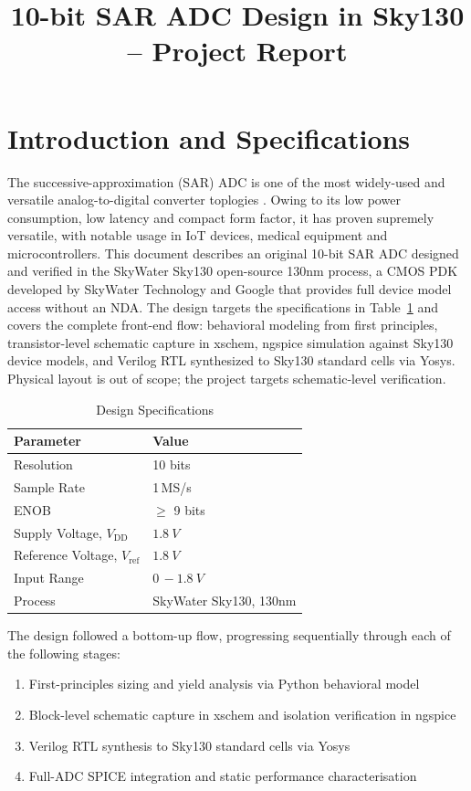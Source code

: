 \documentclass[12pt, a4paper]{article}
\title{10-bit SAR ADC Design in Sky130 -- Project Report}
\author{}
\date{}
\begin{document}
\maketitle
\tableofcontents
\newpage

\section{Introduction and Specifications}
\label{section:intro}
The successive-approximation (SAR) ADC is one of the most widely-used and versatile analog-to-digital converter toplogies \cite{murmann2016sar}.
Owing to its low power consumption, 
low latency and compact form factor, it has proven supremely versatile, with notable usage in IoT devices, medical equipment and microcontrollers. This document describes an original 10-bit SAR ADC designed and verified in the 
SkyWater Sky130 open-source 130nm process, a CMOS PDK developed by SkyWater Technology and Google that provides full device model access without an NDA. 
The design targets the specifications in Table~\ref{tab:specs} and covers the complete front-end flow: behavioral modeling from first principles, transistor-level 
schematic capture in xschem, ngspice simulation against Sky130 device models, and Verilog RTL synthesized to Sky130 standard cells via Yosys. Physical layout 
is out of scope; the project targets schematic-level verification.

\begin{table}[H]
    \centering
    \caption{Design Specifications}
    \label{tab:specs}
    \begin{tabular}{@{}ll@{}}
        \toprule
        Parameter & Value  \\
        \midrule
        Resolution & 10 bits \\
        Sample Rate & 1\,MS/s \\ 
        ENOB & $\geq$ 9 bits \\
        Supply Voltage, $V_\mathrm{DD}$ & $\qty{1.8}{V}$ \\
        Reference Voltage, $V_\mathrm{ref}$ & $\qty{1.8}{V}$ \\
        Input Range & $0\,-\qty{1.8}{V}$ \\
        Process & SkyWater Sky130, 130nm \\
        \bottomrule
    \end{tabular}
\end{table}

The design followed a bottom-up flow, progressing sequentially through each of the following stages:
\begin{enumerate}
    \item First-principles sizing and yield analysis via Python behavioral model
    \item Block-level schematic capture in xschem and isolation verification in ngspice
    \item Verilog RTL synthesis to Sky130 standard cells via Yosys
    \item Full-ADC SPICE integration and static performance characterisation
\end{enumerate}
\end{document}

